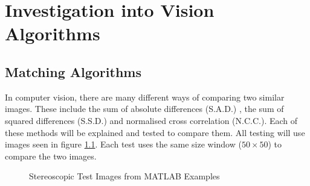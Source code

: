 \chapter{Investigation into Vision Algorithms} \label{Chapter:InvestigationVision}

\section{Matching Algorithms}\label{Section:Comparison}
In computer vision, there are many different ways of comparing two similar images. These include the sum of absolute differences (S.A.D.) \citep{Hamzah:DistanceDetection}, the sum of squared differences (S.S.D.)\citep{Mrovlje:Distance_Stereoscopic} and  normalised cross correlation (N.C.C.)\citep{zhao2006image}. Each of these methods will be explained and tested to compare them. All testing will use images seen in figure \ref{fig:StereoTest}. Each test uses the same size window ($50\times50$) to compare the two images. 

\begin{figure}
\centering
{}
\caption{Stereoscopic Test Images from MATLAB Examples}
\label{fig:StereoTest}
\end{figure}


